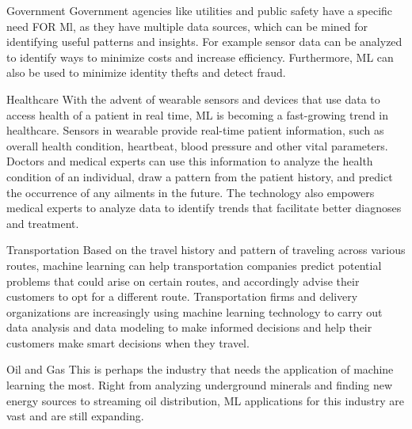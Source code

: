 \documentclass[8pt]{beamer}
\begin{document}
\begin{frame}
\begin{block}{Government}
Government agencies like utilities and public safety have a specific need FOR Ml, as they have multiple data sources, which can be mined for identifying useful patterns and insights. For example sensor data can be analyzed to identify ways to minimize costs and increase efficiency. Furthermore, ML can also be used to minimize identity thefts and detect fraud.
\end{block}
\begin{block}{Healthcare}
With the advent of wearable sensors and devices that use data to access health of a patient in real time, ML is becoming a fast-growing trend in healthcare. Sensors in wearable provide real-time patient information, such as overall health condition, heartbeat, blood pressure and other vital parameters. Doctors and medical experts can use this information to analyze the health condition of an individual, draw a pattern from the patient history, and predict the occurrence of any ailments in the future. The technology also empowers medical experts to analyze data to identify trends that facilitate better diagnoses and treatment.
\end{block}
\end{frame}
\begin{frame}
    \begin{block}{Transportation}
    Based on the travel history and pattern of traveling across various routes, machine learning can help transportation companies predict potential problems that could arise on certain routes, and accordingly advise their customers to opt for a different route. Transportation firms and delivery organizations are increasingly using machine learning technology to carry out data analysis and data modeling to make informed decisions and help their customers make smart decisions when they travel.
    \end{block}
    \begin{block}{Oil and Gas}
    This is perhaps the industry that needs the application of machine learning the most. Right from analyzing underground minerals and finding new energy sources to streaming oil distribution, ML applications for this industry are vast and are still expanding.
    \end{block}
\end{frame}
\end{document}
